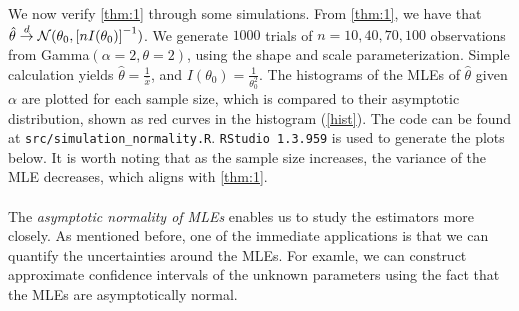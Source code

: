 We now verify \cref{thm:1} through some simulations. From \cref{thm:1}, we have that $\hat{\theta}\overset{d}{\rightarrow} \mathcal{N}(\theta_0, \left[nI(\theta_0)\right]^{-1})$. We generate $1000$ trials of $n=10,40,70,100$ \iid observations from Gamma$(\alpha=2,\theta=2)$, using the shape and scale parameterization. Simple calculation yields $\hat{\theta} = \frac{1}{\bar{x}}$, and $I(\theta_0) = \frac{1}{\theta_0^2}$. The histograms of the MLEs of $\hat{\theta}$ given $\alpha$ are plotted for each sample size, which is compared to their asymptotic distribution, shown as red curves in the histogram (\cref{hist}). The code can be found at \texttt{src/simulation\_normality.R}. \texttt{RStudio 1.3.959} is used to generate the plots below. It is worth noting that as the sample size increases, the variance of the MLE decreases, which aligns with \cref{thm:1}.\\\\
The \emph{asymptotic normality of MLEs} enables us to study the estimators more closely. As mentioned before, one of the immediate applications is that we can quantify the uncertainties around the MLEs. For examle, we can construct approximate confidence intervals of the unknown parameters using the fact that the MLEs are asymptotically normal.
